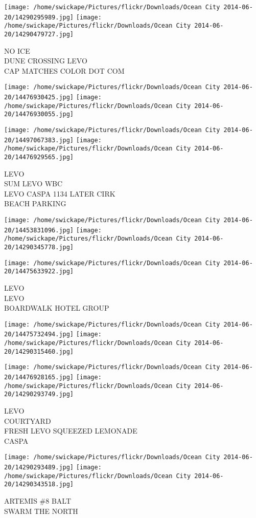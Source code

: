 \documentclass[10pt,letterpaper]{article}
\begin{document}
\vspace{0.25in}
\texttt{[image: /home/swickape/Pictures/flickr/Downloads/Ocean City 2014-06-20/14290295989.jpg]}
\texttt{[image: /home/swickape/Pictures/flickr/Downloads/Ocean City 2014-06-20/14290479727.jpg]}

NO ICE\\
DUNE CROSSING LEVO\\
CAP MATCHES COLOR DOT COM\\
\pagebreak

\texttt{[image: /home/swickape/Pictures/flickr/Downloads/Ocean City 2014-06-20/14476930425.jpg]}
\texttt{[image: /home/swickape/Pictures/flickr/Downloads/Ocean City 2014-06-20/14476930055.jpg]}

\texttt{[image: /home/swickape/Pictures/flickr/Downloads/Ocean City 2014-06-20/14497067383.jpg]}
\texttt{[image: /home/swickape/Pictures/flickr/Downloads/Ocean City 2014-06-20/14476929565.jpg]}

LEVO\\
SUM LEVO WBC\\
LEVO CASPA 1134 LATER CIRK\\
BEACH PARKING\\
\pagebreak

\texttt{[image: /home/swickape/Pictures/flickr/Downloads/Ocean City 2014-06-20/14453831096.jpg]}
\texttt{[image: /home/swickape/Pictures/flickr/Downloads/Ocean City 2014-06-20/14290345778.jpg]}

\vspace{0.25in}
\texttt{[image: /home/swickape/Pictures/flickr/Downloads/Ocean City 2014-06-20/14475633922.jpg]}

LEVO\\
LEVO\\
BOARDWALK HOTEL GROUP\\
\pagebreak

\texttt{[image: /home/swickape/Pictures/flickr/Downloads/Ocean City 2014-06-20/14475732494.jpg]}
\texttt{[image: /home/swickape/Pictures/flickr/Downloads/Ocean City 2014-06-20/14290315460.jpg]}

\texttt{[image: /home/swickape/Pictures/flickr/Downloads/Ocean City 2014-06-20/14476928165.jpg]}
\texttt{[image: /home/swickape/Pictures/flickr/Downloads/Ocean City 2014-06-20/14290293749.jpg]}

LEVO\\
COURTYARD\\
FRESH LEVO SQUEEZED LEMONADE\\
CASPA\\
\pagebreak

\texttt{[image: /home/swickape/Pictures/flickr/Downloads/Ocean City 2014-06-20/14290293489.jpg]}
\texttt{[image: /home/swickape/Pictures/flickr/Downloads/Ocean City 2014-06-20/14290343518.jpg]}

ARTEMIS \#8 BALT\\
SWARM THE NORTH\\
\pagebreak
\end{document}
